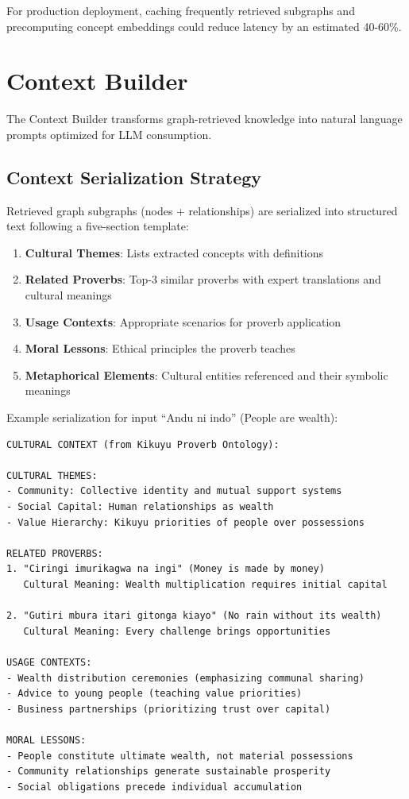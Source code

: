 For production deployment, caching frequently retrieved subgraphs and precomputing concept embeddings could reduce latency by an estimated 40-60\%.

\section{Context Builder}
\label{sec:context_builder}

The Context Builder transforms graph-retrieved knowledge into natural language prompts optimized for LLM consumption.

\subsection{Context Serialization Strategy}
\label{subsec:context_serialization}

Retrieved graph subgraphs (nodes + relationships) are serialized into structured text following a five-section template:

\begin{enumerate}
    \item \textbf{Cultural Themes}: Lists extracted concepts with definitions
    \item \textbf{Related Proverbs}: Top-3 similar proverbs with expert translations and cultural meanings
    \item \textbf{Usage Contexts}: Appropriate scenarios for proverb application
    \item \textbf{Moral Lessons}: Ethical principles the proverb teaches
    \item \textbf{Metaphorical Elements}: Cultural entities referenced and their symbolic meanings
\end{enumerate}

Example serialization for input ``Andu ni indo'' (People are wealth):

\begin{verbatim}
CULTURAL CONTEXT (from Kikuyu Proverb Ontology):

CULTURAL THEMES:
- Community: Collective identity and mutual support systems
- Social Capital: Human relationships as wealth
- Value Hierarchy: Kikuyu priorities of people over possessions

RELATED PROVERBS:
1. "Ciringi imurikagwa na ingi" (Money is made by money)
   Cultural Meaning: Wealth multiplication requires initial capital
   
2. "Gutiri mbura itari gitonga kiayo" (No rain without its wealth)
   Cultural Meaning: Every challenge brings opportunities

USAGE CONTEXTS:
- Wealth distribution ceremonies (emphasizing communal sharing)
- Advice to young people (teaching value priorities)
- Business partnerships (prioritizing trust over capital)

MORAL LESSONS:
- People constitute ultimate wealth, not material possessions
- Community relationships generate sustainable prosperity
- Social obligations precede individual accumulation
\end{verbatim}


